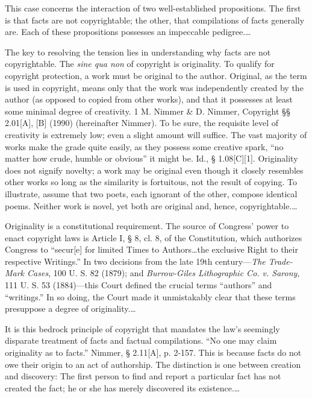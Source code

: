 

This case concerns the interaction of two well-established propositions. The
first is that facts are not copyrightable; the other, that compilations of
facts generally are. Each of these propositions possesses an impeccable
pedigree.\dots

The key to resolving the tension lies in understanding why facts are not
copyrightable. The \textit{sine qua non} of copyright is originality. To
qualify for copyright protection, a work must be original to the author.
Original, as the term is used in copyright, means only that the work was
independently created by the author (as opposed to copied from other works),
and that it possesses at least some minimal degree of creativity. 1 M. Nimmer
\& D. Nimmer, Copyright {\S}{\S} 2.01[A], [B] (1990) (hereinafter Nimmer). To
be sure, the requisite level of creativity is extremely low; even a slight
amount will suffice. The vast majority of works make the grade quite easily, as
they possess some creative spark, ``no matter how crude, humble or obvious'' it
might be. Id., {\S} 1.08[C][1]. Originality does not signify novelty; a work
may be original even though it closely resembles other works so long as the
similarity is fortuitous, not the result of copying. To illustrate, assume that
two poets, each ignorant of the other, compose identical poems. Neither work is
novel, yet both are original and, hence, copyrightable.\dots

Originality is a constitutional requirement. The source of Congress' power to
enact copyright laws is Article I, {\S} 8, cl. 8, of the Constitution, which
authorizes Congress to ``secur[e] for limited Times to Authors\ldots the
exclusive Right to their respective Writings.'' In two decisions from the late
19th century---\textit{The Trade-Mark Cases}, 100 U. S. 82 (1879); and
\textit{Burrow-Giles Lithographic Co. v. Sarony}, 111 U. S. 53 (1884)---this
Court defined the crucial terms ``authors'' and ``writings.'' In so doing, the
Court made it unmistakably clear that these terms presuppose a degree of
originality.\dots

It is this bedrock principle of copyright that mandates the law's seemingly
disparate treatment of facts and factual compilations. ``No one may claim
originality as to facts.'' Nimmer, {\S} 2.11[A], p. 2-157. This is because
facts do not owe their origin to an act of authorship. The distinction is one
between creation and discovery: The first person to find and report a
particular fact has not created the fact; he or she has merely discovered its
existence.\ldots

